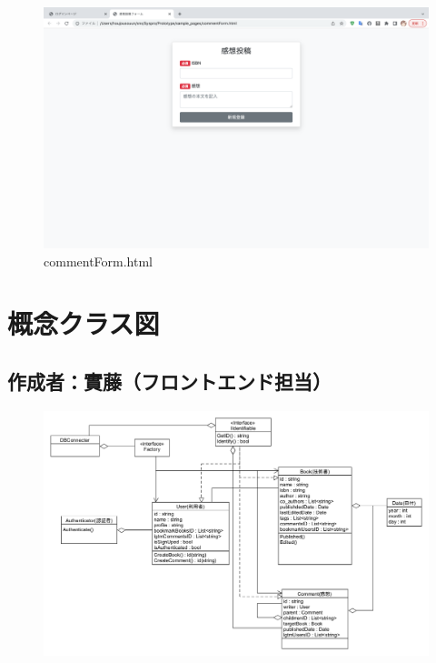 \documentclass[dvipdfmx]{jsarticle}
\begin{document}
    \begin{figure}[H]
        \begin{center}
            \caption*{commentForm.html}
            \includegraphics[scale=0.3,clip]{pictures/commentForm.png}
        \end{center}
    \end{figure}


    \section*{概念クラス図}
    \subsection*{\rm{作成者：實藤（フロントエンド担当）}}
    \begin{figure}[H]
        \begin{center}
            \includegraphics[scale=0.4,clip]{pictures/SysPro-ModelClassImage.png}
        \end{center}
    \end{figure}
\end{document}

